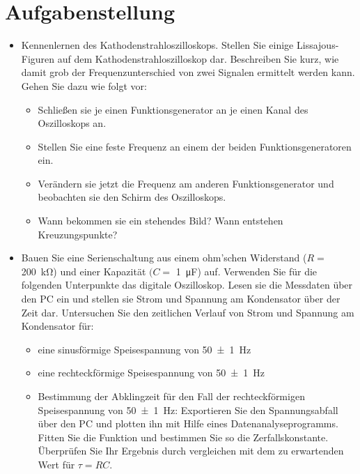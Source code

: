 \documentclass[11pt,ngerman]{scrartcl}
\begin{document}

\tableofcontents
\newpage

\section{Aufgabenstellung\label{Auf0}}

\begin{itemize}
	\item Kennenlernen des Kathodenstrahloszilloskops. Stellen Sie einige Lissajous-Figuren auf dem
	      Kathodenstrahloszilloskop dar. Beschreiben Sie kurz, wie damit grob der Frequenzunterschied
	      von zwei Signalen ermittelt werden kann. Gehen Sie dazu wie folgt vor:
	      \begin{itemize}

		      \item Schließen sie je einen Funktionsgenerator an je einen Kanal des Oszilloskops an.

		      \item Stellen Sie eine feste Frequenz an einem der beiden Funktionsgeneratoren ein.

		      \item Verändern sie jetzt die Frequenz am anderen Funktionsgenerator und beobachten sie den Schirm des Oszilloskops.

		      \item Wann bekommen sie ein stehendes Bild? Wann entstehen Kreuzungspunkte?

	      \end{itemize}

	\item Bauen Sie eine Serienschaltung aus einem ohm’schen Widerstand ($R =$ \SI{200}{\kilo\ohm}) und einer
	      Kapazität $(C =$ \SI{1}{\micro\farad}) auf. Verwenden Sie für die folgenden Unterpunkte das digitale
	      Oszilloskop. Lesen sie die Messdaten über den PC ein und stellen sie Strom und Spannung
	      am Kondensator über der Zeit dar. Untersuchen Sie den zeitlichen Verlauf von Strom und
	      Spannung am Kondensator für:

	      \begin{itemize}

		      \item eine sinusförmige Speisespannung von \SI{50(1)}{\hertz}

		      \item eine rechteckförmige Speisespannung von \SI{50(1)}{\hertz}

		      \item Bestimmung der Abklingzeit für den Fall der rechteckförmigen Speisespannung von
		            \SI{50(1)}{\hertz}: Exportieren Sie den Spannungsabfall über den PC und plotten ihn mit Hilfe
		            eines Datenanalyseprogramms. Fitten Sie die Funktion und bestimmen
		            Sie so die Zerfallskonstante. Überprüfen Sie Ihr Ergebnis durch vergleichen mit
		            dem zu erwartenden Wert für $\tau = R C$.


\end{itemize}
\end{itemize}
\end{document}
